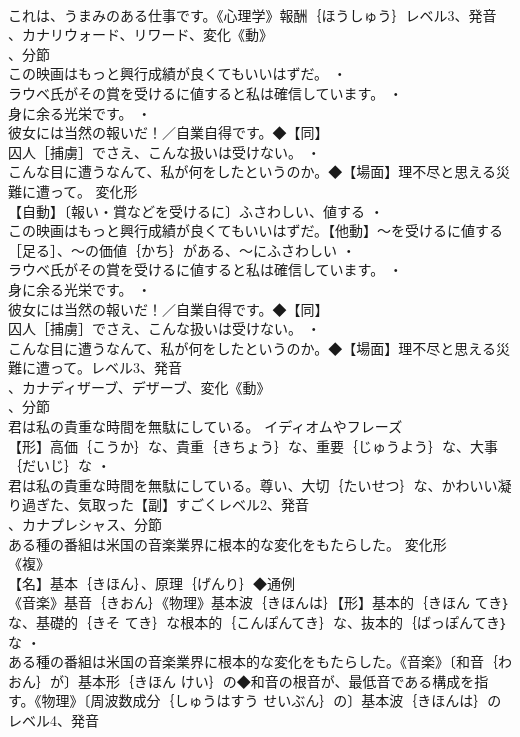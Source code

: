 \documentclass[8pt]{extreport}
\begin{document}
\begin{CJK}{UTF8}{min}
\\	これは、うまみのある仕事です。《心理学》報酬｛ほうしゅう｝レベル3、発音
\\	、カナリウォード、リワード、変化《動》
\\	、分節
\\	この映画はもっと興行成績が良くてもいいはずだ。 ・
\\	ラウベ氏がその賞を受けるに値すると私は確信しています。 ・
\\	身に余る光栄です。 ・
\\	彼女には当然の報いだ！／自業自得です。◆【同】
\\	囚人［捕虜］でさえ、こんな扱いは受けない。 ・
\\	こんな目に遭うなんて、私が何をしたというのか。◆【場面】理不尽と思える災難に遭って。	変化形 
\\	【自動】〔報い・賞などを受けるに〕ふさわしい、値する ・
\\	この映画はもっと興行成績が良くてもいいはずだ。【他動】～を受けるに値する［足る］、～の価値｛かち｝がある、～にふさわしい ・
\\	ラウベ氏がその賞を受けるに値すると私は確信しています。 ・
\\	身に余る光栄です。 ・
\\	彼女には当然の報いだ！／自業自得です。◆【同】
\\	囚人［捕虜］でさえ、こんな扱いは受けない。 ・
\\	こんな目に遭うなんて、私が何をしたというのか。◆【場面】理不尽と思える災難に遭って。レベル3、発音
\\	、カナディザーブ、デザーブ、変化《動》
\\	、分節
\\	君は私の貴重な時間を無駄にしている。	イディオムやフレーズ 
\\	【形】高価｛こうか｝な、貴重｛きちょう｝な、重要｛じゅうよう｝な、大事｛だいじ｝な ・
\\	君は私の貴重な時間を無駄にしている。尊い、大切｛たいせつ｝な、かわいい凝り過ぎた、気取った【副】すごくレベル2、発音
\\	、カナプレシャス、分節
\\	ある種の番組は米国の音楽業界に根本的な変化をもたらした。	変化形 
\\	《複》
\\	【名】基本｛きほん｝、原理｛げんり｝◆通例
\\	《音楽》基音｛きおん｝《物理》基本波｛きほんは｝【形】基本的｛きほん てき｝な、基礎的｛きそ てき｝な根本的｛こんぽんてき｝な、抜本的｛ばっぽんてき｝な ・
\\	ある種の番組は米国の音楽業界に根本的な変化をもたらした。《音楽》〔和音｛わおん｝が〕基本形｛きほん けい｝の◆和音の根音が、最低音である構成を指す。《物理》〔周波数成分｛しゅうはすう せいぶん｝の〕基本波｛きほんは｝のレベル4、発音

\end{CJK}
\end{document}
